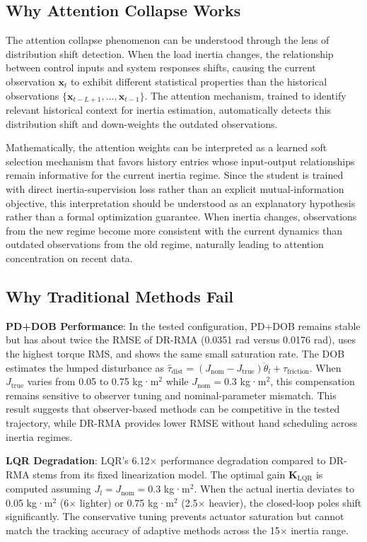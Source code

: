 \documentclass[lettersize,journal]{IEEEtran}
\begin{document}
\subsection{Why Attention Collapse Works}

The attention collapse phenomenon can be understood through the lens of distribution shift detection. When the load inertia changes, the relationship between control inputs and system responses shifts, causing the current observation $\bm{x}_t$ to exhibit different statistical properties than the historical observations $\{\bm{x}_{t-L+1}, \ldots, \bm{x}_{t-1}\}$. The attention mechanism, trained to identify relevant historical context for inertia estimation, automatically detects this distribution shift and down-weights the outdated observations.

Mathematically, the attention weights can be interpreted as a learned soft selection mechanism that favors history entries whose input-output relationships remain informative for the current inertia regime. Since the student is trained with direct inertia-supervision loss rather than an explicit mutual-information objective, this interpretation should be understood as an explanatory hypothesis rather than a formal optimization guarantee. When inertia changes, observations from the new regime become more consistent with the current dynamics than outdated observations from the old regime, naturally leading to attention concentration on recent data.

\subsection{Why Traditional Methods Fail}

\textbf{PD+DOB Performance}: In the tested configuration, PD+DOB remains stable but has about twice the RMSE of DR-RMA (0.0351 rad versus 0.0176 rad), uses the highest torque RMS, and shows the same small saturation rate. The DOB estimates the lumped disturbance as $\hat{\tau}_{\text{dist}} = (J_{\text{nom}} - J_{\text{true}}) \ddot{\theta}_l + \tau_{\text{friction}}$. When $J_{\text{true}}$ varies from 0.05 to 0.75 kg·m$^2$ while $J_{\text{nom}} = 0.3$ kg·m$^2$, this compensation remains sensitive to observer tuning and nominal-parameter mismatch. This result suggests that observer-based methods can be competitive in the tested trajectory, while DR-RMA provides lower RMSE without hand scheduling across inertia regimes.

\textbf{LQR Degradation}: LQR's 6.12× performance degradation compared to DR-RMA stems from its fixed linearization model. The optimal gain $\bm{K}_{\text{LQR}}$ is computed assuming $J_l = J_{\text{nom}} = 0.3$ kg·m$^2$. When the actual inertia deviates to 0.05 kg·m$^2$ (6× lighter) or 0.75 kg·m$^2$ (2.5× heavier), the closed-loop poles shift significantly. The conservative tuning prevents actuator saturation but cannot match the tracking accuracy of adaptive methods across the 15× inertia range.
\end{document}
